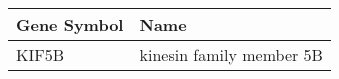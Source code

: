\begin{tabular}{ll}
\toprule
Gene Symbol &                     Name \\
\midrule
      KIF5B & kinesin family member 5B \\
\bottomrule
\end{tabular}
